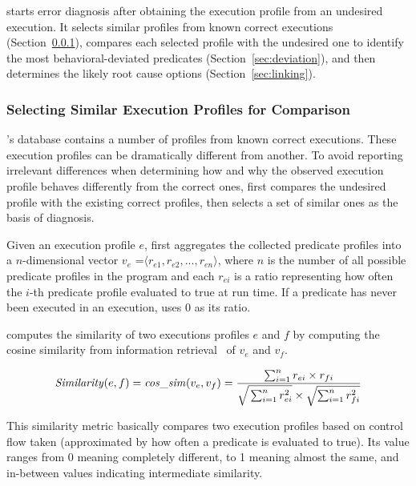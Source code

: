 \ourtool starts error diagnosis after obtaining the execution profile from
an undesired execution. It selects similar
profiles from known correct executions (Section~\ref{sec:similar}), compares
each selected profile with
the undesired one to identify the most behavioral-deviated predicates
(Section~\ref{sec:deviation}), and then determines
the likely root cause options (Section~\ref{sec:linking}).


\subsubsection{Selecting Similar Execution Profiles for Comparison}
\label{sec:similar}

\ourtool's database contains a number of
profiles from known correct executions.  These execution profiles 
can be dramatically different from another.  To avoid reporting irrelevant
differences when 
determining how and why the observed execution profile behaves
differently from the correct ones, \ourtool first
compares the undesired profile with the existing
correct profiles, then selects a set of similar ones
as the basis of diagnosis.

Given an execution profile $e$, \ourtool first aggregates
the collected predicate profiles into a $n$-dimensional
vector $v_e$ =$\langle r_{e1}, r_{e2}, ..., r_{en}\rangle$, where $n$
is the number of all possible predicate profiles in the program
and each $r_{ei}$ is a ratio representing how often the $i$-th predicate
profile evaluated to true at run time.
If a predicate has never been executed in an execution,
\ourtool uses 0 as its ratio. 

\ourtool computes the similarity of two executions profiles $e$ and $f$
by computing the cosine similarity from information retrieval~\cite{Witten96managinggigabytes}
of $v_{e}$ and $v_{f}$.

\vspace{-3mm}

{\small{
\[
\|Similarity|(e, f) = \|cos\_sim|(v_{e}, v_{f}) = \frac{\sum_{i = 1}^{n}r_{ei} \times r_{fi}}
{\sqrt{\strut \sum_{i = 1}^{n}r_{ei}^2} \times \sqrt{\sum_{i = 1}^{n}r_{fi}^2}}
\]
}}

\vspace{-3mm}

This similarity metric basically compares two execution profiles based on
 control flow taken (approximated by how often a predicate is evaluated to
true). Its value ranges from 0 meaning completely different, to 1 meaning almost the same, 
and in-between values indicating intermediate similarity.


